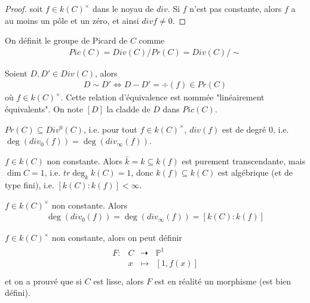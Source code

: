         \begin{proof}
            soit $f \in k(C)^\times$ dans le noyau de $div$. Si $f$ n'est pas constante, alors $f$ a au moins un pôle et un zéro, et ainsi $div f \neq 0$.
        \end{proof}
        \begin{defi}
            On définit le groupe de Picard de $C$ comme
            \begin{align*}
                Pic(C) = Div(C)/Pr(C) = Div(C)/\sim
            \end{align*}
        \end{defi}
        \begin{nota}
            Soient $D,D' \in Div(C)$, alors
            \begin{align*}
                D \sim D' \iff D - D' = \div(f) \in Pr(C)
            \end{align*}
            où $f\in k(C)^\times$. Cette relation d'équivalence est nommée "linéairement équivalents". On note $[D]$ la cladde de $D$ dans $Pic(C)$.
        \end{nota}
        \begin{theo}
            \label{*}
            $Pr(C) \subseteq Div^0(C)$, i.e. pour tout $f \in k(C)^\times$, $div(f)$ est de degré $0$, i.e. $\deg (div_0(f)) = \deg (div_\infty(f))$.
        \end{theo}
        \begin{remq}
            $f \in k(C)$ non constante. Alors $\bar k = k \subseteq k(f)$ est purement transcendante, mais $\dim C = 1$, i.e. $tr \deg_kk(C) = 1$, donc $k(f) \subseteq k(C)$ est algébrique (et de type fini), i.e. $[k(C) : k(f)] < \infty$.
        \end{remq}
        \begin{theo}
            \label{**}
            $f \in k(C)^\times$ non constante. Alors
            \begin{align*}
                \deg(div_0(f)) = \deg(div_\infty(f)) = [k(C):k(f)]
            \end{align*}
        \end{theo}
        \begin{remq}
            $f \in k(C)^\times$ non constante, alors on peut définir
            \begin{align*}
                \begin{array}{cccc}
                    F : & C & \dashrightarrow & \mathbb{P}^1 \\
                    & x & \mapsto & [1, f(x)]\\
                \end{array}
            \end{align*}
            et on a prouvé que si $C$ est lisse, alors $F$ est en réalité un morphisme (est bien défini).
        \end{remq}
